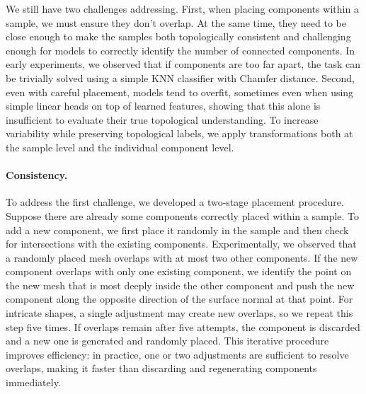 We still have two challenges addressing. First, when placing components within a sample, we must ensure they don't overlap. At the same time, they need to be close enough to make the samples both topologically consistent and challenging enough for models to correctly identify the number of connected components. In early experiments, we observed that if components are too far apart, the task can be trivially solved using a simple KNN classifier with Chamfer distance. Second, even with careful placement, models tend to overfit, sometimes even when using simple linear heads on top of learned features, showing that this alone is insufficient to evaluate their true topological understanding. To increase variability while preserving topological labels, we apply transformations both at the sample level and the individual component level.

\paragraph{Consistency.} 
To address the first challenge, we developed a two-stage placement procedure. Suppose there are already some components correctly placed within a sample. To add a new component, we first place it randomly in the sample and then check for intersections with the existing components. Experimentally, we observed that a randomly placed mesh overlaps with at most two other components. If the new component overlaps with only one existing component, we identify the point on the new mesh that is most deeply inside the other component and push the new component along the opposite direction of the surface normal at that point. For intricate shapes, a single adjustment may create new overlaps, so we repeat this step five times. If overlaps remain after five attempts, the component is discarded and a new one is generated and randomly placed. This iterative procedure improves efficiency: in practice, one or two adjustments are sufficient to resolve overlaps, making it faster than discarding and regenerating components immediately.

